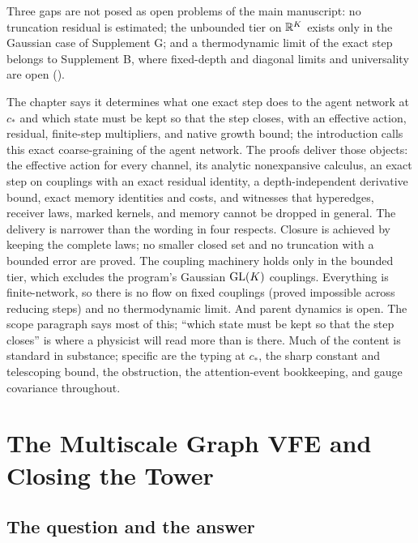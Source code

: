 Three gaps are not posed as open problems of the main manuscript: no truncation residual is estimated;
the unbounded tier on $\mathbb R^K$ exists only in the Gaussian case of Supplement G; and a thermodynamic limit
of the exact step belongs to Supplement B, where fixed-depth and diagonal limits and universality are
open ().

\begin{verdictbox}{\NARROWER}
The chapter says it determines what one exact step does to the agent network at $c_*$ and which state
must be kept so that the step closes, with an effective action, residual, finite-step multipliers, and
native growth bound; the introduction calls this exact coarse-graining of the agent network. The proofs
deliver those objects: the effective action for every channel, its analytic nonexpansive calculus, an
exact step on couplings with an exact residual identity, a depth-independent derivative bound, exact
memory identities and costs, and witnesses that hyperedges, receiver laws, marked kernels, and memory
cannot be dropped in general. The delivery is narrower than the wording in four respects. Closure is
achieved by keeping the complete laws; no smaller closed set and no truncation with a bounded error are
proved. The coupling machinery holds only in the bounded tier, which excludes the program's Gaussian
$\mathrm{GL}(K)$ couplings. Everything is finite-network, so there is no flow on fixed couplings (proved
impossible across reducing steps) and no thermodynamic limit. And parent dynamics is open. The scope
paragraph says most of this; ``which state must be kept so that the step closes'' is where a physicist
will read more than is there. Much of the content is standard in substance; specific are the typing at
$c_*$, the sharp constant and telescoping bound, the obstruction, the attention-event bookkeeping, and
gauge covariance throughout.
\end{verdictbox}

\chapter{The Multiscale Graph VFE and Closing the Tower}
\label{comp:ch12}

\section{The question and the answer}
\label{comp:ch12-question}

